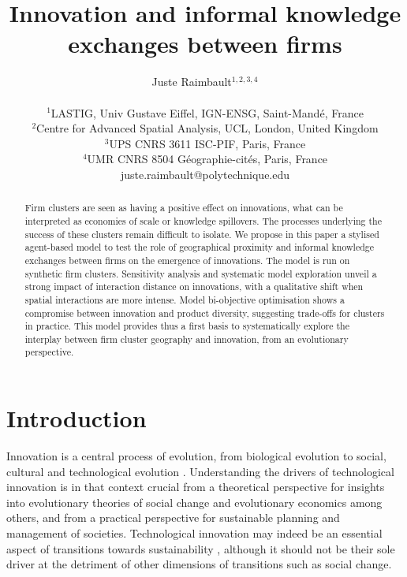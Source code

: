 \documentclass[letterpaper]{article}
\title{Innovation and informal knowledge exchanges between firms}
\author{Juste Raimbault$^{1,2,3,4}$\\
\mbox{}\\
$^1$LASTIG, Univ Gustave Eiffel, IGN-ENSG, Saint-Mand{\'e}, France\\
$^2$Centre for Advanced Spatial Analysis, UCL, London, United Kingdom\\
$^3$UPS CNRS 3611 ISC-PIF, Paris, France\\
$^4$UMR CNRS 8504 G{\'e}ographie-cit{\'e}s, Paris, France\medskip\\
juste.raimbault@polytechnique.edu}
\begin{document}
\maketitle

\begin{abstract}
Firm clusters are seen as having a positive effect on innovations, what can be interpreted as economies of scale or knowledge spillovers. The processes underlying the success of these clusters remain difficult to isolate. We propose in this paper a stylised agent-based model to test the role of geographical proximity and informal knowledge exchanges between firms on the emergence of innovations. The model is run on synthetic firm clusters. Sensitivity analysis and systematic model exploration unveil a strong impact of interaction distance on innovations, with a qualitative shift when spatial interactions are more intense. Model bi-objective optimisation shows a compromise between innovation and product diversity, suggesting trade-offs for clusters in practice. This model provides thus a first basis to systematically explore the interplay between firm cluster geography and innovation, from an evolutionary perspective.
\end{abstract}



\section{Introduction}

Innovation is a central process of evolution, from biological evolution to social, cultural \citep{mesoudi2018cumulative} and technological evolution \citep{sood2005technological}. Understanding the drivers of technological innovation is in that context crucial from a theoretical perspective for insights into evolutionary theories of social change and evolutionary economics among others, and from a practical perspective for sustainable planning and management of societies. Technological innovation may indeed be an essential aspect of transitions towards sustainability \citep{adams2016sustainability}, although it should not be their sole driver at the detriment of other dimensions of transitions such as social change.
\end{document}
